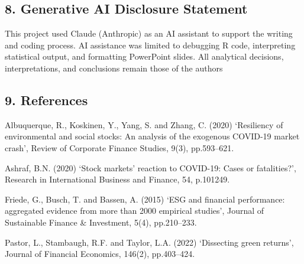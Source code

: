 \documentclass[
]{article}
\begin{document}
\subsection{8. Generative AI Disclosure
Statement}\label{generative-ai-disclosure-statement}

This project used Claude (Anthropic) as an AI assistant to support the
writing and coding process. AI assistance was limited to debugging R
code, interpreting statistical output, and formatting PowerPoint slides.
All analytical decisions, interpretations, and conclusions remain those
of the authors

\subsection{9. References}\label{references}

Albuquerque, R., Koskinen, Y., Yang, S. and Zhang, C. (2020) `Resiliency
of environmental and social stocks: An analysis of the exogenous
COVID-19 market crash', Review of Corporate Finance Studies, 9(3),
pp.593--621.

Ashraf, B.N. (2020) `Stock markets' reaction to COVID-19: Cases or
fatalities?', Research in International Business and Finance, 54,
p.101249.

Friede, G., Busch, T. and Bassen, A. (2015) `ESG and financial
performance: aggregated evidence from more than 2000 empirical studies',
Journal of Sustainable Finance \& Investment, 5(4), pp.210--233.

Pastor, L., Stambaugh, R.F. and Taylor, L.A. (2022) `Dissecting green
returns', Journal of Financial Economics, 146(2), pp.403--424.
\end{document}
